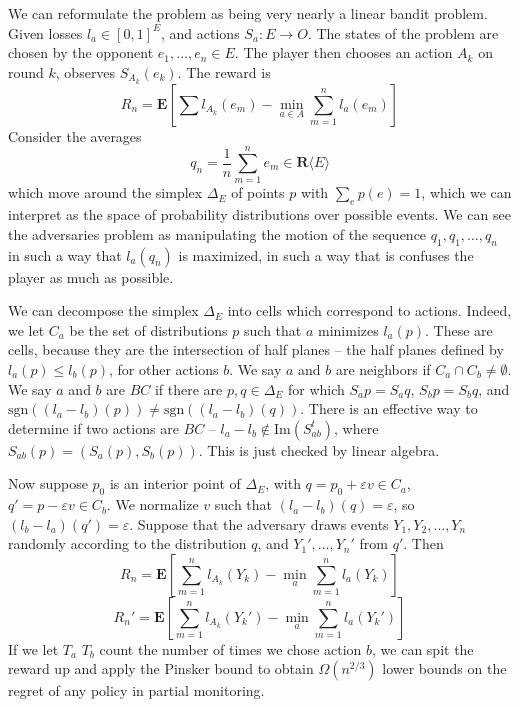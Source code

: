 We can reformulate the problem as being very nearly a linear bandit problem. Given losses $l_a \in [0,1]^E$, and actions $S_a: E \to O$. The states of the problem are chosen by the opponent $e_1, \dots, e_n \in E$. The player then chooses an action $A_k$ on round $k$, observes $S_{A_k}(e_k)$. The reward is
%
\[ R_n = \mathbf{E} \left[ \sum l_{A_k}(e_m) - \min_{a \in A} \sum_{m = 1}^n l_a(e_m) \right] \]
%
Consider the averages
%
\[ q_n = \frac{1}{n} \sum_{m = 1}^n e_m \in \mathbf{R} \langle E \rangle \]
%
which move around the simplex $\Delta_E$ of points $p$ with $\sum_e p(e) = 1$, which we can interpret as the space of probability distributions over possible events. We can see the adversaries problem as manipulating the motion of the sequence $q_1, q_1, \dots, q_n$ in such a way that $l_a(q_n)$ is maximized, in such a way that is confuses the player as much as possible.

We can decompose the simplex $\Delta_E$ into cells which correspond to actions. Indeed, we let $C_a$ be the set of distributions $p$ such that $a$ minimizes $l_a(p)$. These are cells, because they are the intersection of half planes -- the half planes defined by $l_a(p) \leq l_b(p)$, for other actions $b$. We say $a$ and $b$ are neighbors if $C_a \cap C_b \neq \emptyset$. We say $a$ and $b$ are $BC$ if there are $p,q \in \Delta_E$ for which $S_a p = S_a q$, $S_b p = S_b q$, and $\text{sgn}((l_a - l_b)(p)) \neq \text{sgn}((l_a - l_b)(q))$. There is an effective way to determine if two actions are $BC$ -- $l_a - l_b \not \in \text{Im}(S_{ab}^t)$, where $S_{ab}(p) = (S_a(p), S_b(p))$. This is just checked by linear algebra.

Now suppose $p_0$ is an interior point of $\Delta_E$, with $q = p_0 + \varepsilon v \in C_a$, $q' = p - \varepsilon v \in C_b$. We normalize $v$ such that $(l_a - l_b)(q) = \varepsilon$, so $(l_b - l_a)(q') = \varepsilon$. Suppose that the adversary draws events $Y_1, Y_2, \dots, Y_n$ randomly according to the distribution $q$, and $Y_1', \dots, Y_n'$ from $q'$. Then
%
\[ R_n = \mathbf{E} \left[\sum_{m = 1}^n l_{A_k}(Y_k) - \min_a \sum_{m = 1}^n l_a(Y_k) \right] \]
\[ R_n' = \mathbf{E} \left[ \sum_{m = 1}^n l_{A_k}(Y_k') - \min_a \sum_{m = 1}^n l_a(Y_k') \right] \]
%
If we let $T_a$ $T_b$ count the number of times we chose action $b$, we can spit the reward up and apply the Pinsker bound to obtain $\Omega(n^{2/3})$ lower bounds on the regret of any policy in partial monitoring.

